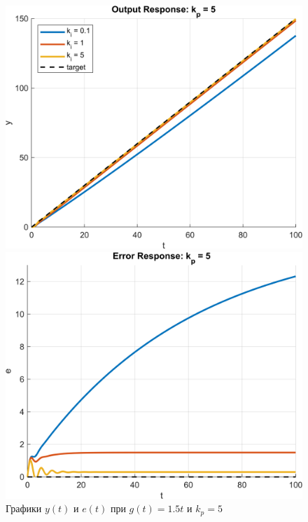 \begin{figure}[H]
    \centering
    \begin{minipage}{0.45\textwidth}
        \centering
        \includegraphics[width=1\textwidth, trim={1cm 0cm 1cm 0cm}]{../images/input_2_kp_5_output.png}
    \end{minipage}
    \hfill
    \begin{minipage}{0.45\textwidth}
        \centering
        \includegraphics[width=1\textwidth, trim={1cm 0cm 1cm 0cm}]{../images/input_2_kp_5_error.png}
    \end{minipage}
    \caption{Графики $y(t)$ и $e(t)$ при $g(t) = 1.5t$ и $k_p = 5$}
\end{figure}
